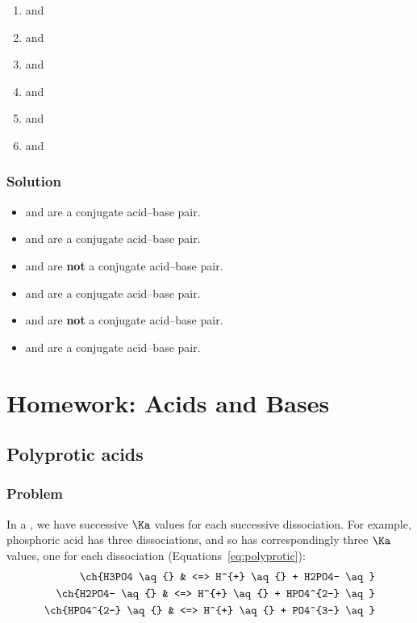 \begin{enumerate}
	\item {} and 
	\item {} and 
	\item {} and 
	\item {} and 
	\item {} and 
	\item {} and 
\end{enumerate}
\subsubsection{Solution}
\begin{itemize}
	\item {\color{accent}  and } are a conjugate acid--base pair.
	\item {\color{accent}  and } are a conjugate acid--base pair.
	\item {} and  are \textbf{not} a conjugate acid--base pair.
	\item {\color{accent}  and } are a conjugate acid--base pair.
	\item {} and  are \textbf{not} a conjugate acid--base pair.
	\item {\color{accent}  and } are a conjugate acid--base pair.
\end{itemize}

\pagebreak
\section{Homework: Acids and Bases}
\subsection{Polyprotic acids}
\subsubsection{Problem}
In a  ,
we have successive \(\Ka\) values for each successive
dissociation. For example, phosphoric acid has three dissociations, and so has
correspondingly three \(\Ka\) values, one for each dissociation (Equations~\ref{eq:polyprotic}):
\begin{align*}
	\ch{H3PO4 \aq{}     & <=> H^{+} \aq{} + H2PO4- \aq}    \\%
	\ch{H2PO4- \aq{}    & <=> H^{+} \aq{} + HPO4^{2-} \aq} \\%
	\ch{HPO4^{2-} \aq{} & <=> H^{+} \aq{} + PO4^{3-} \aq}
	\label{eq:polyprotic}
\end{align*}

